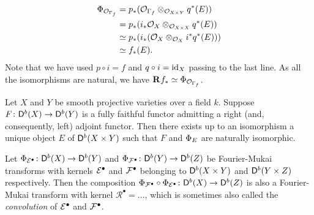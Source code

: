\begin{example}
\begin{enumerate}[label = (\roman*)]
{    \begin{align*}
        \Phi_{\mathcal{O}_{\Gamma_f}} &= p_*(\mathcal{O}_{\Gamma_f} \otimes_{\mathcal{O}_{X \times Y}} q^*(E)) \\
        &= p_*(i_*\mathcal{O}_{X} \otimes_{\mathcal{O}_{X \times X}} q^*(E)) \\
        &\simeq p_*(i_*(\mathcal{O}_{X} \otimes_{\mathcal{O}_{X}} i^*q^*(E))) \\
        &\simeq f_*(E).
    \end{align*}
    Note that we have used $p \circ i = f$ and $q \circ i = \operatorname{id}_{X}$ passing to the last line. As all the isomorphisms are natural, we have $\mathbf{R}^{}f_* \simeq \Phi_{\mathcal{O}_{\Gamma_f}}$.
    }
\end{enumerate}
\end{example}

\begin{theorem}
    \label{Orlov's theorem}
    Let $X$ and $Y$ be smooth projective varieties over a field $k$. Suppose $F \colon \mathsf{D}^b(X) \to \mathsf{D}^b(Y)$ is a fully faithful functor admitting a right (and, consequently, left) adjoint functor. Then there exists up to an isomorphism a unique object $E$ of $\mathsf{D}^b(X \times Y)$ such that $F$ and $\Phi_{E}$ are naturally isomorphic.
\end{theorem}

\begin{proposition}
    \label{Composition of fm is fm}
    Let $\Phi_{\mathcal E^\bullet} \colon \mathsf{D}^b(X) \to \mathsf{D}^b(Y)$ and $\Phi_{\mathcal F^\bullet} \colon \mathsf{D}^b(Y) \to \mathsf{D}^b(Z)$ be Fourier-Mukai transforms with kernels $\mathcal E^\bullet$ and $\mathcal F^\bullet$ belonging to $\mathsf{D}^b(X \times Y)$ and $\mathsf{D}^b(Y \times Z)$ respectively. Then the composition $\Phi_{\mathcal F^\bullet} \circ \Phi_{\mathcal E^\bullet} \colon \mathsf{D}^b(X) \to \mathsf{D}^b(Z)$ is also a Fourier-Mukai transform with kernel $\mathcal R^\bullet = ...$, which is sometimes also called the \emph{convolution} of $\mathcal E^\bullet$ and $\mathcal F^\bullet$.
\end{proposition}

